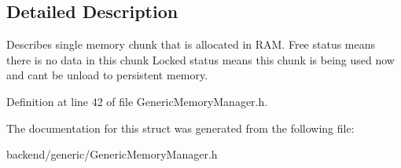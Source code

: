 \subsection{Detailed Description}
Describes single memory chunk that is allocated in R\+AM. Free status means there is no data in this chunk Locked status means this chunk is being used now and can\textquotesingle{}t be unload to persistent memory. 

Definition at line 42 of file Generic\+Memory\+Manager.\+h.



The documentation for this struct was generated from the following file\+:\begin{DoxyCompactItemize}
\item 
backend/generic/Generic\+Memory\+Manager.\+h\end{DoxyCompactItemize}
